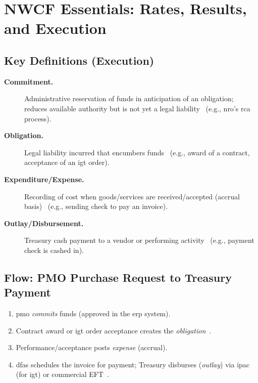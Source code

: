 \documentclass[../main.tex]{subfiles}
\begin{document}
\section{NWCF Essentials: Rates, Results, and Execution}
\minibib
\subsection{Key Definitions (Execution)}
\begin{description}
	\item[\textbf{Commitment.}] Administrative reservation of funds in anticipation of an obligation; reduces available authority but is not yet a legal liability~\autocite{DoDFMR-Vol3} (e.g., \ac{nro}'s \ac{rca} process).
	\item[\textbf{Obligation.}] Legal liability incurred that encumbers funds~\autocite{DoDFMR-Vol3} (e.g., award of a contract, acceptance of an \ac{igt} order).
	\item[\textbf{Expenditure/Expense.}] Recording of cost when goods/services are received/accepted (accrual basis)~\autocite{DoDFMR-Vol3} (e.g., sending check to pay an invoice).
	\item[\textbf{Outlay/Disbursement.}] Treasury cash payment to a vendor or performing activity~\autocite{DoDFMR-Vol3} (e.g., payment check is cashed in).
\end{description}

\subsection{Flow: PMO Purchase Request to Treasury Payment}
\begin{enumerate}
	\item \ac{pmo} \emph{commits} funds (approved in the \ac{erp} system). %
	\item Contract award or \ac{igt} order acceptance creates the \emph{obligation}~\autocite{DoDFMR-Vol3,Treasury-GInvoicing}.
	\item Performance/acceptance posts \emph{expense} (accrual). %
	\item \ac{dfas} schedules the invoice for payment; Treasury disburses (\emph{outlay}) via \ac{ipac} (for \ac{igt}) or commercial EFT~\autocite{Treasury-GInvoicing}.
\end{enumerate}
\end{document}
